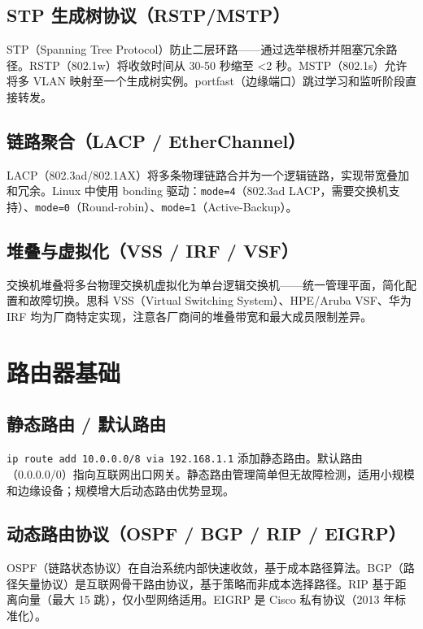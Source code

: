 \documentclass[12pt,UTF8]{ctexbook}
\begin{document}
    \subsection{STP 生成树协议（RSTP/MSTP）}

STP（Spanning Tree Protocol）防止二层环路——通过选举根桥并阻塞冗余路径。RSTP（802.1w）将收敛时间从 30-50 秒缩至 <2 秒。MSTP（802.1s）允许将多 VLAN 映射至一个生成树实例。portfast（边缘端口）跳过学习和监听阶段直接转发。

    \subsection{链路聚合（LACP / EtherChannel）}

LACP（802.3ad/802.1AX）将多条物理链路合并为一个逻辑链路，实现带宽叠加和冗余。Linux 中使用 bonding 驱动：\verb|mode=4|（802.3ad LACP，需要交换机支持）、\verb|mode=0|（Round-robin）、\verb|mode=1|（Active-Backup）。

    \subsection{堆叠与虚拟化（VSS / IRF / VSF）}

交换机堆叠将多台物理交换机虚拟化为单台逻辑交换机——统一管理平面，简化配置和故障切换。思科 VSS（Virtual Switching System）、HPE/Aruba VSF、华为 IRF 均为厂商特定实现，注意各厂商间的堆叠带宽和最大成员限制差异。

  \section{路由器基础}
    \subsection{静态路由 / 默认路由}

\verb|ip route add 10.0.0.0/8 via 192.168.1.1| 添加静态路由。默认路由（0.0.0.0/0）指向互联网出口网关。静态路由管理简单但无故障检测，适用小规模和边缘设备；规模增大后动态路由优势显现。

    \subsection{动态路由协议（OSPF / BGP / RIP / EIGRP）}

OSPF（链路状态协议）在自治系统内部快速收敛，基于成本路径算法。BGP（路径矢量协议）是互联网骨干路由协议，基于策略而非成本选择路径。RIP 基于距离向量（最大 15 跳），仅小型网络适用。EIGRP 是 Cisco 私有协议（2013 年标准化）。
\end{document}
